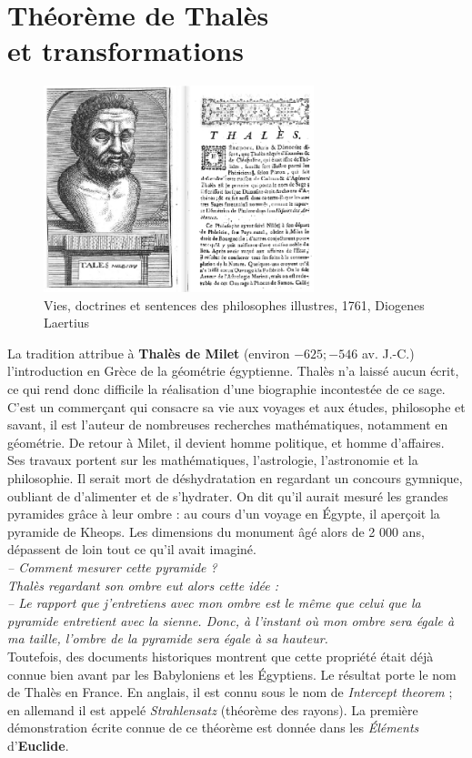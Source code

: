 \chapter{Théorème de Thalès\\et transformations} \label{G11}

\bigskip

\begin{figure}[h]
   \centering
      \includegraphics[height=6cm]{Geometrie/Images/G11_intro_Thales}
   \caption{Vies, doctrines et sentences des philosophes illustres, 1761, Diogenes Laertius}
\end{figure}

\bigskip

\begin{prerequis}
    La tradition attribue à \textbf{Thalès de Milet} (environ $-625 ; -546$ av. J.-C.) l'introduction en Grèce de la géométrie égyptienne. Thalès n'a laissé aucun écrit, ce qui rend donc difficile la réalisation d'une biographie incontestée de ce sage. C'est un commerçant qui consacre sa vie aux voyages et aux études, philosophe et savant, il est l'auteur de nombreuses recherches mathématiques, notamment en géométrie. De retour à Milet, il devient homme politique, et homme d'affaires. Ses travaux portent sur les mathématiques, l'astrologie, l'astronomie et la philosophie. Il serait mort de déshydratation en regardant un concours gymnique, oubliant de d'alimenter et de s'hydrater.
    On dit qu’il aurait mesuré les grandes pyramides grâce à leur ombre : au cours d'un voyage en Égypte, il aperçoit la pyramide de Kheops. Les dimensions du monument âgé alors de 2 000 ans, dépassent de loin tout ce qu’il avait imaginé. \\
{\it – \og Comment mesurer cette pyramide ? \fg \\
Thalès regardant son ombre eut alors cette idée : \\
– \og Le rapport que j’entretiens avec mon ombre est le même que celui que la pyramide entretient avec la sienne. Donc, à l’instant où mon ombre sera égale à ma taille, l’ombre de la pyramide sera égale à sa hauteur. \fg} \\
    Toutefois, des documents historiques montrent que cette propriété était déjà connue bien avant par les Babyloniens et les Égyptiens. Le résultat porte le nom de Thalès en France. En anglais, il est connu sous le nom de {\it Intercept theorem} ; en allemand il est appelé {\it Strahlensatz} (théorème des rayons). La première démonstration écrite connue de ce théorème est donnée dans les {\it Éléments} d’{\bf Euclide}.
\end{prerequis}

